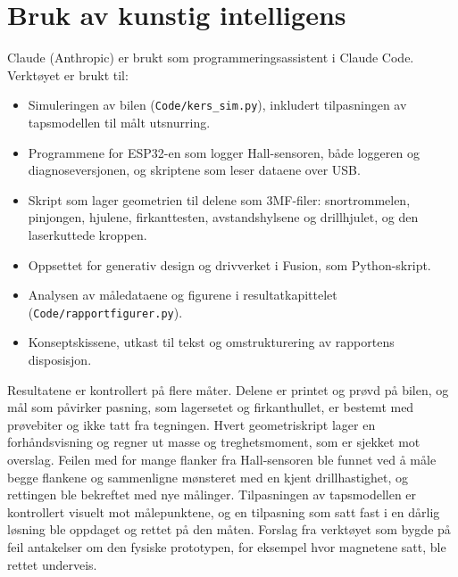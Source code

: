 \section{Bruk av kunstig intelligens}
\label{sec:ki}
Claude (Anthropic) er brukt som programmeringsassistent i Claude Code. Verktøyet er brukt til:
\begin{itemize}
    \item Simuleringen av bilen (\texttt{Code/kers\_sim.py}), inkludert tilpasningen av tapsmodellen til målt utsnurring.
    \item Programmene for ESP32-en som logger Hall-sensoren, både loggeren og diagnoseversjonen, og skriptene som leser dataene over USB.
    \item Skript som lager geometrien til delene som 3MF-filer: snortrommelen, pinjongen, hjulene, firkanttesten, avstandshylsene og drillhjulet, og den laserkuttede kroppen.
    \item Oppsettet for generativ design og drivverket i Fusion, som Python-skript.
    \item Analysen av måledataene og figurene i resultatkapittelet (\texttt{Code/rapportfigurer.py}).
    \item Konseptskissene, utkast til tekst og omstrukturering av rapportens disposisjon.
\end{itemize}

Resultatene er kontrollert på flere måter. Delene er printet og prøvd på bilen, og mål som påvirker pasning, som lagersetet og firkanthullet, er bestemt med prøvebiter og ikke tatt fra tegningen. Hvert geometriskript lager en forhåndsvisning og regner ut masse og treghetsmoment, som er sjekket mot overslag. Feilen med for mange flanker fra Hall-sensoren ble funnet ved å måle begge flankene og sammenligne mønsteret med en kjent drillhastighet, og rettingen ble bekreftet med nye målinger. Tilpasningen av tapsmodellen er kontrollert visuelt mot målepunktene, og en tilpasning som satt fast i en dårlig løsning ble oppdaget og rettet på den måten. Forslag fra verktøyet som bygde på feil antakelser om den fysiske prototypen, for eksempel hvor magnetene satt, ble rettet underveis.
